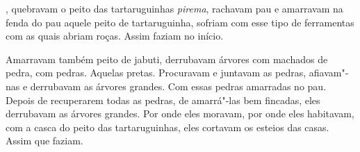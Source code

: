  

, quebravam o peito das
tartaruguinhas \emph{pirema}, rachavam pau e amarravam na fenda do pau
aquele peito de tartaruguinha, sofriam com esse tipo de ferramentas com
as quais abriam roças. Assim faziam no início.

Amarravam também peito de jabuti, derrubavam árvores com machados de
pedra, com pedras. Aquelas pretas. Procuravam e juntavam as pedras,
afiavam"-nas e derrubavam as árvores grandes. Com essas pedras amarradas
no pau. Depois de recuperarem todas as pedras, de amarrá"-las bem
fincadas, eles derrubavam as árvores grandes. Por onde eles moravam, por
onde eles habitavam, com a casca do peito das tartaruguinhas, eles
cortavam os esteios das casas. Assim que faziam.

 

